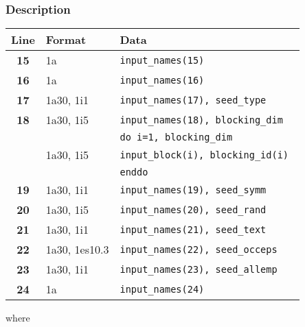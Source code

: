 \documentclass[a4paper,11pt]{article}
\begin{document}
\subsubsection*{Description}
\begin{center}
\begin{tabular}{|c|l|l|}
\hline
Line & Format & Data \\
\hline
 \textbf{15}   & 1a    & \tt input\_names(15)                        \\
 \textbf{16}   & 1a    & \tt input\_names(16)                        \\
 \textbf{17}   & 1a30, 1i1 & \tt input\_names(17), seed\_type        \\
 \textbf{18}   & 1a30, 1i5 & \tt input\_names(18), blocking\_dim     \\
               &           & \tt do i=1, blocking\_dim               \\
 \textbf{  }   & 1a30, 1i5 & \:\: \tt input\_block(i),  blocking\_id(i) \\
               &           & \tt enddo                               \\
 \textbf{19}   & 1a30, 1i1 & \tt input\_names(19), seed\_symm        \\
 \textbf{20}   & 1a30, 1i5 & \tt input\_names(20), seed\_rand        \\
 \textbf{21}   & 1a30, 1i1 & \tt input\_names(21), seed\_text        \\
 \textbf{22}   & 1a30, 1es10.3 & \tt input\_names(22), seed\_occeps  \\
 \textbf{23}   & 1a30, 1i1 & \tt input\_names(23), seed\_allemp      \\
 \textbf{24}   & 1a    & \tt input\_names(24)                        \\
\hline
\end{tabular}
\end{center}
where
\end{document}

